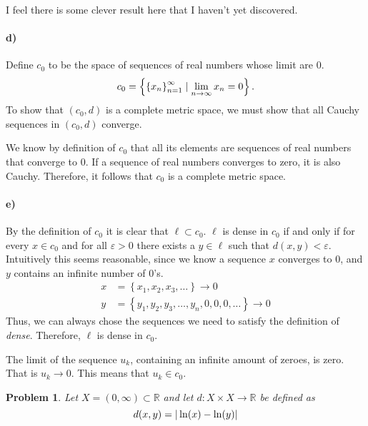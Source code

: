\documentclass[a4paper]{article}
\newtheorem{prb}{Problem}
\theoremstyle{definition}
\begin{document}
I feel there is some clever result here that I haven't yet discovered. 
\paragraph{d)}
Define $c_0$ to be the space of sequences of real numbers whose limit are 0.
\begin{equation}
  \notag
  c_{0} = \left\{ \left\{ x_n \right\}_{n=1}^{\infty} \mid \lim\limits_{n\rightarrow\infty} x_n = 0 \right\}.
\end{equation}
To show that $\left( c_0, d \right)$ is a complete metric space, we must show
that all Cauchy sequences in $\left( c_0, d \right)$ converge.

We know by definition of $c_0$ that all its elements are sequences of real
numbers that converge to $0$.  If a sequence of real numbers converges to zero,
it is also Cauchy. Therefore, it follows that $c_0$ is a complete metric space.

\paragraph{e)}

By the definition of $c_0$ it is clear that $\ell \subset c_0$.  $\ell$ is
dense in $c_0$ if and only if for every $x \in c_0$ and for all $\varepsilon >
0$ there exists a $y \in \ell$ such that $d(x, y) < \varepsilon$.  Intuitively
this seems reasonable, since we know a sequence $x$ converges to $0$, and $y$
contains an infinite number of $0$'s.
\begin{align*}
x &= \left\{ x_1, x_2, x_3, \ldots \right\} \longrightarrow 0\\
y &= \left\{ y_1, y_2, y_3, \ldots, y_n, 0, 0, 0, \ldots \right\} \longrightarrow 0
\end{align*}
Thus, we can always chose the sequences we need to satisfy the definition of
\textit{dense}.  Therefore, $\ell$ is dense in $c_0$.

The limit of the sequence $u_k$, containing an infinite amount of zeroes, is
zero.  That is $u_k \longrightarrow 0$. This means that $u_k \in c_0$.

\begin{prb}
  Let $X = \left( 0, \infty \right) \subset \mathbb{R}$ and let $d : X \times X \longrightarrow \mathbb{R}$ be defined as
  \begin{equation}
    \notag
    d(x, y) = | \ln(x) - \ln(y)|
  \end{equation}
\end{prb}
\end{document}
